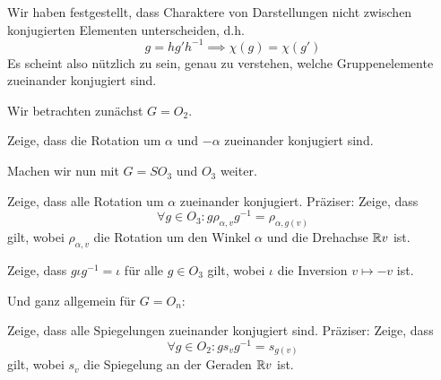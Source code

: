 \begin{sheet}

\begin{problem}[title={Konjugation in orthogonalen Gruppen}]\label{gruppen:ex:konjugation}
Wir haben festgestellt, dass Charaktere von Darstellungen nicht zwischen konjugierten Elementen unterscheiden, d.h.
\[ g=hg'h^{-1} \implies \chi(g) = \chi(g') \]
Es scheint also nützlich zu sein, genau zu verstehen, welche Gruppenelemente zueinander konjugiert sind.

Wir betrachten zunächst $G=O_2$.
\begin{subproblem}
Zeige, dass die Rotation um $\alpha$ und $-\alpha$ zueinander konjugiert sind.
\end{subproblem}

Machen wir nun mit $G=SO_3$ und $O_3$ weiter.
\begin{subproblem}
Zeige, dass alle Rotation um $\alpha$ zueinander konjugiert. Präziser: Zeige, dass
\[\forall g\in O_3: g\rho_{\alpha,v}g^{-1} = \rho_{\alpha,g(v)} \]
gilt, wobei $\rho_{\alpha,v}$ die Rotation um den Winkel $\alpha$ und die Drehachse $\mathbb{R} v$ ist.
\end{subproblem}
\begin{subproblem}
Zeige, dass $g\iota g^{-1}=\iota$ für alle $g\in O_3$ gilt, wobei $\iota$ die Inversion $v\mapsto -v$ ist.
\end{subproblem}

Und ganz allgemein für $G=O_n$:
\begin{subproblem}
Zeige, dass alle Spiegelungen zueinander konjugiert sind. Präziser: Zeige, dass
\[\forall g\in O_2: gs_vg^{-1} = s_{g(v)}\]
gilt, wobei $s_v$ die Spiegelung an der Geraden $\mathbb{R} v$ ist.
\end{subproblem}
\end{problem}

\end{sheet}